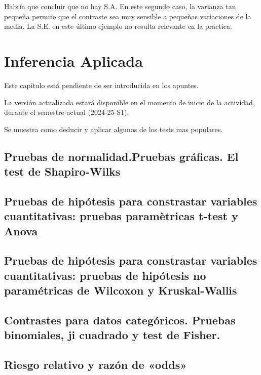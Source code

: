 \documentclass[
]{article}
\begin{document}
Habría que concluir que no hay S.A. En este segundo caso, la varianza tan pequeña permite que el contraste sea muy sensible a pequeñas variaciones de la media. La S.E. en este último ejemplo no resulta relevante en la práctica.

\section{Inferencia Aplicada}\label{inferencia-aplicada}

Este capítulo está pendiente de ser introducida en los apuntes.

La versión actualizada estará disponible en el momento de inicio de la actividad, durante el semestre actual (2024-25-S1).

Se muestra como deducir y aplicar algunos de los tests mas populares.

\subsection{Pruebas de normalidad.Pruebas gráficas. El test de Shapiro-Wilks}\label{pruebas-de-normalidad.pruebas-gruxe1ficas.-el-test-de-shapiro-wilks}

\subsection{Pruebas de hipótesis para constrastar variables cuantitativas: pruebas paramètricas t-test y Anova}\label{pruebas-de-hipuxf3tesis-para-constrastar-variables-cuantitativas-pruebas-paramuxe8tricas-t-test-y-anova}

\subsection{Pruebas de hipótesis para constrastar variables cuantitativas: pruebas de hipótesis no paramétricas de Wilcoxon y Kruskal-Wallis}\label{pruebas-de-hipuxf3tesis-para-constrastar-variables-cuantitativas-pruebas-de-hipuxf3tesis-no-paramuxe9tricas-de-wilcoxon-y-kruskal-wallis}

\subsection{Contrastes para datos categóricos. Pruebas binomiales, ji cuadrado y test de Fisher.}\label{contrastes-para-datos-categuxf3ricos.-pruebas-binomiales-ji-cuadrado-y-test-de-fisher.}

\subsection{Riesgo relativo y razón de «odds»}\label{riesgo-relativo-y-razuxf3n-de-odds}
\end{document}
